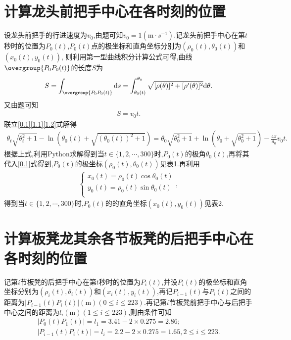 \documentclass[lang=cn,newtx,10pt,scheme=chinese]{../Template/elegantbook}
\begin{document}
\section{计算龙头前把手中心在各时刻的位置}\label{1.(2)}

设龙头前把手的行进速度为\(v_0\),由题可知\(v_0 = 1(\mathrm{m}\cdot s^{-1})\).记龙头前把手中心在第\(t\)秒时的位置为\(P_0(t)\),\(P_0(t)\)点的极坐标和直角坐标分别为\((\rho _0(t),\theta _0(t))\)和\((x_0(t),y_0(t))\),
则利用第一型曲线积分计算公式可得,曲线\(\overgroup{P_0P_0(t)}\)的长度\(S\)为
\begin{align}
S=\int_{\overgroup{P_0P_0(t)}}{\mathrm{d}s}=\int_{\theta _0(t)}^{\theta _0}{\sqrt{[\rho (\theta )]^2+[\rho ' (\theta )]^2}\mathrm{d}\theta}.\label{1.1}
\end{align}
又由题可知
\begin{align}
S = v_0t.\label{1.2}
\end{align}
联立\eqref{0.1}\eqref{1.1}\eqref{1.2}式解得
\begin{align}
\theta _t\sqrt{\theta _{t}^{2}+1}-\ln (\theta _0(t)+\sqrt{(\theta _0(t))^2+1}) =\theta _0\sqrt{\theta _{0}^{2}+1}+\ln (\theta _0+\sqrt{\theta _{0}^{2}+1}) -\frac{4\pi}{d_0}v_0t .
\end{align}
根据上式,利用Python求解得到当\(t\in \{ 1,2,\cdots ,300 \}\)时,\(P_0(t)\)的极角\(\theta _0(t)\),再将其代入\eqref{0.1}式得到,\(P_0(t)\)的极坐标\((\rho _0(t),\theta _0(t))\)见表1.再利用
\begin{align}
\begin{cases}
x_0(t)=\rho _0(t)\cos \theta _0(t)\\
y_0(t)=\rho _0(t)\sin \theta _0(t)\\
\end{cases},
\end{align}
得到当\(t\in \{ 1,2,\cdots ,300 \}\)时,\(P_0(t)\)的的直角坐标\((x_0(t),y_0(t))\)见表2.

\section{计算板凳龙其余各节板凳的后把手中心在各时刻的位置}

记第\(i\)节板凳的后把手中心在第\(t\)秒时的位置为\(P_{i}(t)\),并设\(P_{i}(t)\)的极坐标和直角坐标分别为\((\rho _{i}(t),\theta _{i}(t))\)和\((x_{i}(t),y_{i}(t))\),再记\(P_{i-1}(t)\)与\(P_{i}(t)\)之间的距离为\(| P_{i-1}(t)P_{i}(t)|(\mathrm{m}) (0\leqslant i\leqslant 223)\).再记第$i$节板凳前把手中心与后把手中心之间的距离为\(l_i(\mathrm{m})(1\leq i\leq 223)\),则由条件可知
\begin{gather}
| P_0(t)P_1(t)| = l_1 = 3.41 - 2\times 0.275 = 2.86;
\\
| P_{i-1}(t)P_{i}(t)| = l_i = 2.2 - 2\times 0.275 = 1.65,2\leqslant i\leqslant 223.
\end{gather}
\end{document}
